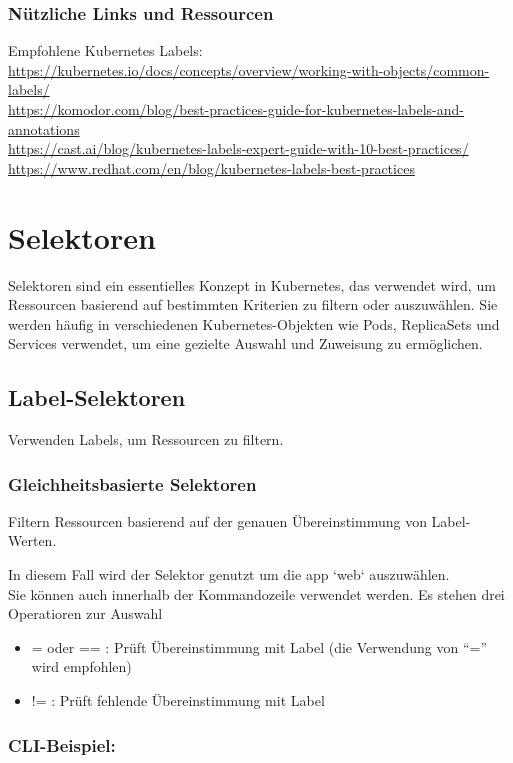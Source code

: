\subsubsection{Nützliche Links und Ressourcen}
Empfohlene Kubernetes Labels:\\
\url{https://kubernetes.io/docs/concepts/overview/working-with-objects/common-labels/}\\
\url{https://komodor.com/blog/best-practices-guide-for-kubernetes-labels-and-annotations}\\
\url{https://cast.ai/blog/kubernetes-labels-expert-guide-with-10-best-practices/}\\
\url{https://www.redhat.com/en/blog/kubernetes-labels-best-practices}\\


\section{Selektoren}
Selektoren sind ein essentielles Konzept in Kubernetes, das verwendet wird, um Ressourcen basierend auf bestimmten Kriterien zu filtern oder auszuwählen. Sie werden häufig in verschiedenen Kubernetes-Objekten wie Pods, ReplicaSets und Services verwendet, um eine gezielte Auswahl und Zuweisung zu ermöglichen.

\subsection{Label-Selektoren}
Verwenden Labels, um Ressourcen zu filtern.

\subsubsection{Gleichheitsbasierte Selektoren}
Filtern Ressourcen basierend auf der genauen Übereinstimmung von Label-Werten.

\noindent
In diesem Fall wird der Selektor genutzt um die app `web` auszuwählen.\\
Sie können auch innerhalb der Kommandozeile verwendet werden. Es stehen drei Operatioren zur Auswahl
\begin{itemize}
    \item = oder == : Prüft Übereinstimmung mit Label (die Verwendung von \enquote{=} wird empfohlen)
    \item != : Prüft fehlende Übereinstimmung mit Label
\end{itemize}
\subsubsection{CLI-Beispiel:}


